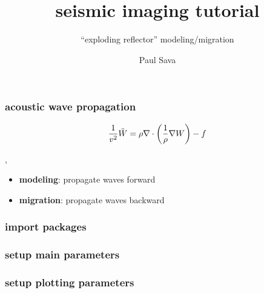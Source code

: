 


\title[]{seismic imaging tutorial}
\subtitle{``exploding reflector'' modeling/migration}
\author[]{Paul Sava}
\date{}
\logo{}
\large

 { \cwpcover }


\begin{frame} \frametitle{acoustic wave propagation}

\[
\frac{1}{v^2} \ddot{W} = 
\rho \nabla \cdot {\left (\frac{1}{\rho} \nabla {W} \right)} -f
\]

\sep

\begin{itemize}
   \item \textbf{modeling}: propagate waves forward
   \item \textbf{migration}: propagate waves backward 
\end{itemize}

\end{frame}
\cwpnote{}

\begin{frame} \frametitle{import packages}
  \normalsize
  \blueshade{
    
  }
\end{frame}
\cwpnote{}

\begin{frame} \frametitle{setup main parameters}
  \normalsize
  \blueshade{
    
  }
\end{frame}
\cwpnote{}

\begin{frame} \frametitle{setup plotting parameters}
  \normalsize
  \blueshade{
    
  }
\end{frame}
\cwpnote{}

